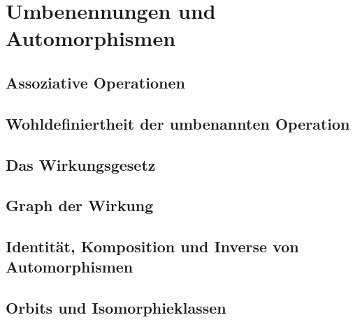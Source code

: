 \section{Umbenennungen und Automorphismen}
\subsection{Assoziative Operationen}
\hypertarget{table-isomorphisms.proof.FiniteSemigroupAssociativeOperationSemigroup}{}


\subsection{Wohldefiniertheit der umbenannten Operation}
\hypertarget{table-isomorphisms.proof.FiniteSemigroupRelabelledOperationDef}{}


\subsection{Das Wirkungsgesetz}
\hypertarget{table-isomorphisms.proof.FiniteSemigroupRelabellingAction}{}
\begingroup
\renewcommand{\theformulaThm}{37.4.1.5}

\endgroup

\subsection{Graph der Wirkung}
\hypertarget{table-isomorphisms.proof.FiniteSemigroupRelabelGraphCharacterization}{}


\subsection{Identität, Komposition und Inverse von Automorphismen}
\hypertarget{table-isomorphisms.proof.automorphisms}{}


\subsection{Orbits und Isomorphieklassen}
\hypertarget{table-isomorphisms.proof.FiniteSemigroupRelabelOrbitsAreIsomorphismClasses}{}


